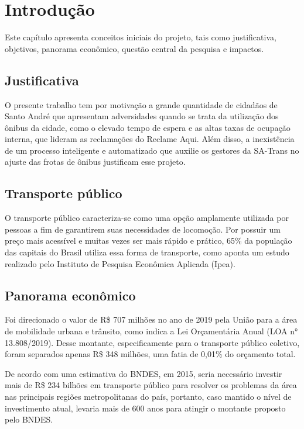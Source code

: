 \chapter{Introdução}
\label{Cap:Intro}
\indent
\par Este capítulo apresenta conceitos iniciais do projeto, tais como justificativa, objetivos, panorama econômico, questão central da pesquisa e impactos.


\section{Justificativa}
\indent
\par O presente trabalho tem por motivação a grande quantidade de cidadãos de Santo André que apresentam adversidades quando se trata da utilização dos ônibus da cidade, como o elevado tempo de espera e as altas taxas de ocupação interna, que lideram as reclamações do Reclame Aqui. Além disso, a inexistência de um processo inteligente e automatizado que auxilie os gestores da SA-Trans no ajuste das frotas de ônibus justificam esse projeto.

\section{Transporte público}
\indent
\par O transporte público caracteriza-se como uma opção amplamente utilizada por pessoas a fim de garantirem suas necessidades de locomoção. Por possuir um preço mais acessível e muitas vezes ser mais rápido e prático, 65\% da população das capitais do Brasil utiliza essa forma de transporte, como aponta um estudo realizado pelo Instituto de Pesquisa Econômica Aplicada (Ipea).

\section{Panorama econômico}
\indent
\par Foi direcionado o valor de R\$ 707 milhões no ano de 2019 pela União para a área de mobilidade urbana e trânsito, como indica a Lei Orçamentária Anual (LOA n° 13.808/2019). Desse montante, especificamente para o transporte público coletivo, foram separados apenas R\$ 348 milhões, uma fatia de 0,01\% do orçamento total.
\par De acordo com uma estimativa do BNDES, em 2015, seria necessário investir mais de R\$ 234 bilhões em transporte público para resolver os problemas da área nas principais regiões metropolitanas do país, portanto, caso mantido o nível de investimento atual, levaria mais de 600 anos para atingir o montante proposto pelo BNDES.


